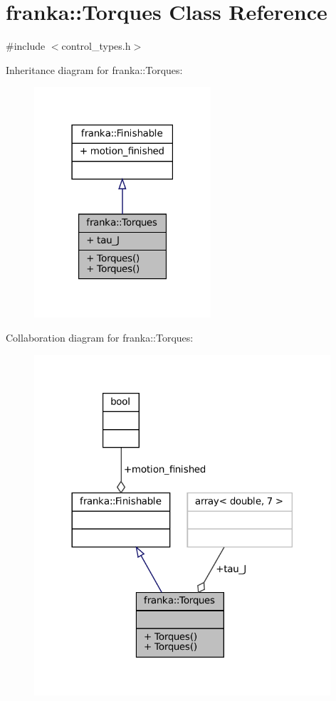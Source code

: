 \hypertarget{classfranka_1_1Torques}{}\section{franka\+:\+:Torques Class Reference}
\label{classfranka_1_1Torques}


{\ttfamily \#include $<$control\+\_\+types.\+h$>$}



Inheritance diagram for franka\+:\+:Torques\+:
\nopagebreak
\begin{figure}[H]
\begin{center}
\leavevmode
\includegraphics[width=186pt]{classfranka_1_1Torques__inherit__graph}
\end{center}
\end{figure}


Collaboration diagram for franka\+:\+:Torques\+:
\nopagebreak
\begin{figure}[H]
\begin{center}
\leavevmode
\includegraphics[width=312pt]{classfranka_1_1Torques__coll__graph}
\end{center}
\end{figure}
